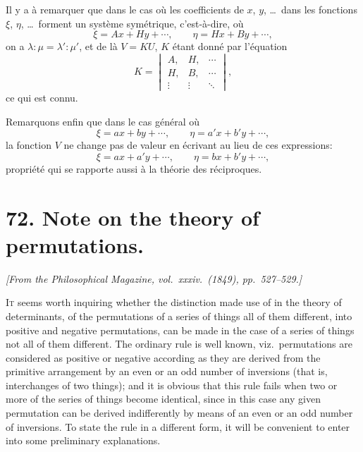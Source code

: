 \documentclass[11pt,a4paper]{article}
\theoremstyle{definition}
\begin{document}
Il y a \`{a} remarquer que dans le cas o\`{u} les coefficients de $x$, $y$, \ldots\ dans les fonctions $\xi$, $\eta$, \ldots\ forment un syst\`{e}me sym\'{e}trique, c'est-\`{a}-dire, o\`{u}
\[
\xi = Ax + Hy + \cdots, \qquad \eta = Hx + By + \cdots,
\]
on a $\lambda:\mu = \lambda':\mu'$, et de l\`{a} $V = KU$, $K$ \'{e}tant donn\'{e} par l'\'{e}quation
\[
K = \begin{vmatrix}
A, & H, & \cdots \\
H, & B, & \cdots \\
\vdots & \vdots & \ddots
\end{vmatrix},
\]
ce qui est connu.

Remarquons enfin que dans le cas g\'{e}n\'{e}ral o\`{u}
\[
\xi = ax + by + \cdots, \qquad \eta = a'x + b'y + \cdots,
\]
la fonction $V$ ne change pas de valeur en \'{e}crivant au lieu de ces expressions:
\[
\xi = ax + a'y + \cdots, \qquad \eta = bx + b'y + \cdots,
\]
propri\'{e}t\'{e} qui se rapporte aussi \`{a} la th\'{e}orie des r\'{e}ciproques.



\newpage
\section*{72. Note on the theory of permutations.}

\begin{flushright}
\textit{[From the Philosophical Magazine, vol.\ xxxiv.\ (1849), pp.\ 527--529.]}
\end{flushright}

\setcounter{page}{423}

\textsc{It} seems worth inquiring whether the distinction made use of in the theory of determinants, of the permutations of a series of things all of them different, into positive and negative permutations, can be made in the case of a series of things not all of them different. The ordinary rule is well known, viz.\ permutations are considered as positive or negative according as they are derived from the primitive arrangement by an even or an odd number of inversions (that is, interchanges of two things); and it is obvious that this rule fails when two or more of the series of things become identical, since in this case any given permutation can be derived indifferently by means of an even or an odd number of inversions. To state the rule in a different form, it will be convenient to enter into some preliminary explanations.
\end{document}
